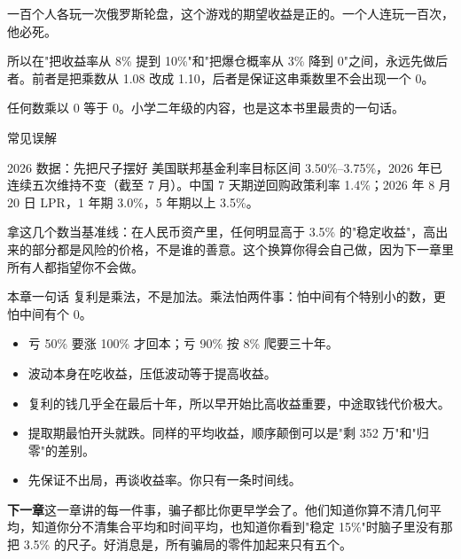 \begin{pullquote}{}
一百个人各玩一次俄罗斯轮盘，这个游戏的期望收益是正的。一个人连玩一百次，他必死。
\end{pullquote}

所以在"把收益率从 8\% 提到 10\%"和"把爆仓概率从 3\% 降到 0"之间，永远先做后者。前者是把乘数从 1.08 改成 1.10，后者是保证这串乘数里不会出现一个 0。

任何数乘以 0 等于 0。小学二年级的内容，也是这本书里最贵的一句话。

\begin{mythbox}{常见误解}
\end{mythbox}

\begin{databox}{2026 数据：先把尺子摆好}
美国联邦基金利率目标区间 3.50\%–3.75\%，2026 年已连续五次维持不变（截至 7 月）。中国 7 天期逆回购政策利率 1.4\%；2026 年 8 月 20 日 LPR，1 年期 3.0\%，5 年期以上 3.5\%。

拿这几个数当基准线：在人民币资产里，任何明显高于 3.5\% 的"稳定收益"，高出来的部分都是风险的价格，不是谁的善意。这个换算你得会自己做，因为下一章里所有人都指望你不会做。

\end{databox}

\begin{takeaway}{本章一句话}
复利是乘法，不是加法。乘法怕两件事：怕中间有个特别小的数，更怕中间有个 0。

\begin{itemize}
  \item 亏 50\% 要涨 100\% 才回本；亏 90\% 按 8\% 爬要三十年。
  \item 波动本身在吃收益，压低波动等于提高收益。
  \item 复利的钱几乎全在最后十年，所以早开始比高收益重要，中途取钱代价极大。
  \item 提取期最怕开头就跌。同样的平均收益，顺序颠倒可以是"剩 352 万"和"归零"的差别。
  \item 先保证不出局，再谈收益率。你只有一条时间线。
\end{itemize}

\end{takeaway}

\begin{bridgebox}
\textbf{下一章}这一章讲的每一件事，骗子都比你更早学会了。他们知道你算不清几何平均，知道你分不清集合平均和时间平均，也知道你看到"稳定 15\%"时脑子里没有那把 3.5\% 的尺子。好消息是，所有骗局的零件加起来只有五个。
\end{bridgebox}

